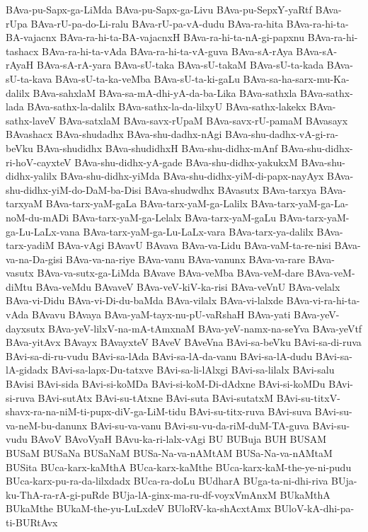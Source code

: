 {BAva-pu-Sapx-ga-LiMda
BAva-pu-Sapx-ga-Livu
BAva-pu-SepxY-yaRtf
BAva-rUpa
BAva-rU-pa-do-Li-ralu
BAva-rU-pa-vA-dudu
BAva-ra-hita
BAva-ra-hi-ta-BA-vajacnx
BAva-ra-hi-ta-BA-vajacnxH
BAva-ra-hi-ta-nA-gi-papxnu
BAva-ra-hi-tashacx
BAva-ra-hi-ta-vAda
BAva-ra-hi-ta-vA-guva
BAva-sA-rAya
BAva-sA-rAyaH
BAva-sA-rA-yara
BAva-sU-taka
BAva-sU-takaM
BAva-sU-ta-kada
BAva-sU-ta-kava
BAva-sU-ta-ka-veMba
BAva-sU-ta-ki-gaLu
BAva-sa-ha-sarx-mu-Ka-dalilx
BAva-sahxlaM
BAva-sa-mA-dhi-yA-da-ba-Lika
BAva-sathxla
BAva-sathx-lada
BAva-sathx-la-dalilx
BAva-sathx-la-da-lilxyU
BAva-sathx-lakekx
BAva-sathx-laveV
BAva-satxlaM
BAva-savx-rUpaM
BAva-savx-rU-pamaM
BAvasayx
BAvashacx
BAva-shudadhx
BAva-shu-dadhx-nAgi
BAva-shu-dadhx-vA-gi-ra-beVku
BAva-shudidhx
BAva-shudidhxH
BAva-shu-didhx-mAnf
BAva-shu-didhx-ri-hoV-cayxteV
BAva-shu-didhx-yA-gade
BAva-shu-didhx-yakukxM
BAva-shu-didhx-yalilx
BAva-shu-didhx-yiMda
BAva-shu-didhx-yiM-di-papx-nayAyx
BAva-shu-didhx-yiM-do-DaM-ba-Disi
BAva-shudwdhx
BAvasutx
BAva-tarxya
BAva-tarxyaM
BAva-tarx-yaM-gaLa
BAva-tarx-yaM-ga-Lalilx
BAva-tarx-yaM-ga-La-noM-du-mADi
BAva-tarx-yaM-ga-Lelalx
BAva-tarx-yaM-gaLu
BAva-tarx-yaM-ga-Lu-LaLx-vana
BAva-tarx-yaM-ga-Lu-LaLx-vara
BAva-tarx-ya-dalilx
BAva-tarx-yadiM
BAva-vAgi
BAvavU
BAvava
BAva-va-Lidu
BAva-vaM-ta-re-nisi
BAva-va-na-Da-gisi
BAva-va-na-riye
BAva-vanu
BAva-vanunx
BAva-va-rare
BAva-vasutx
BAva-va-sutx-ga-LiMda
BAvave
BAva-veMba
BAva-veM-dare
BAva-veM-diMtu
BAva-veMdu
BAvaveV
BAva-veV-kiV-ka-risi
BAva-veVnU
BAva-velalx
BAva-vi-Didu
BAva-vi-Di-du-baMda
BAva-vilalx
BAva-vi-lalxde
BAva-vi-ra-hi-ta-vAda
BAvavu
BAvaya
BAva-yaM-tayx-nu-pU-vaRshaH
BAva-yati
BAva-yeV-dayxsutx
BAva-yeV-lilxV-na-mA-tAmxnaM
BAva-yeV-namx-na-seYva
BAva-yeVtf
BAva-yitAvx
BAvayx
BAvayxteV
BAveV
BAveVna
BAvi-sa-beVku
BAvi-sa-di-ruva
BAvi-sa-di-ru-vudu
BAvi-sa-lAda
BAvi-sa-lA-da-vanu
BAvi-sa-lA-dudu
BAvi-sa-lA-gidadx
BAvi-sa-lapx-Du-tatxve
BAvi-sa-li-lAlxgi
BAvi-sa-lilalx
BAvi-salu
BAvisi
BAvi-sida
BAvi-si-koMDa
BAvi-si-koM-Di-dAdxne
BAvi-si-koMDu
BAvi-si-ruva
BAvi-sutAtx
BAvi-su-tAtxne
BAvi-suta
BAvi-sutatxM
BAvi-su-titxV-shavx-ra-na-niM-ti-pupx-diV-ga-LiM-tidu
BAvi-su-titx-ruva
BAvi-suva
BAvi-su-va-neM-bu-danunx
BAvi-su-va-vanu
BAvi-su-vu-da-riM-duM-TA-guva
BAvi-su-vudu
BAvoV
BAvoVyaH
BAvu-ka-ri-lalx-vAgi
BU
BUBuja
BUH
BUSAM
BUSaM
BUSaNa
BUSaNaM
BUSa-Na-va-nAMtAM
BUSa-Na-va-nAMtaM
BUSita
BUca-karx-kaMthA
BUca-karx-kaMthe
BUca-karx-kaM-the-ye-ni-pudu
BUca-karx-pu-ra-da-lilxdadx
BUca-ra-doLu
BUdharA
BUga-ta-ni-dhi-riva
BUja-ku-ThA-ra-rA-gi-puRde
BUja-lA-ginx-ma-ru-df-voyxVmAnxM
BUkaMthA
BUkaMthe
BUkaM-the-yu-LuLxdeV
BUloRV-ka-shAcxtAmx
BUloV-kA-dhi-pa-ti-BURtAvx
}
